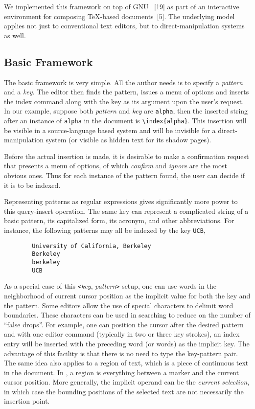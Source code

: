 We implemented this framework on top of
GNU {\E}~[19] as part of an interactive environment for
composing {\TeX}-based documents~[5].
The underlying model applies not just to conventional text
editors, but to direct-manipulation systems as well.

\subsection{Basic Framework}
The basic framework is very simple.  All the author needs is
to specify a {\it pattern\/} and a {\it key\/}.
The editor then finds the pattern,
issues a menu of options and inserts the index command along with the key
as its argument upon the user's request.
In our example, suppose both {\it pattern\/} and {\it key\/} are
\verb|alpha|, then the inserted string after an instance
of \verb|alpha| in the document is \verb|\index{alpha}|.
This insertion will be visible in a source-language based system and will be
invisible for a direct-manipulation system (or visible as hidden text
for its shadow pages).

Before the actual insertion is made, it is desirable to make a confirmation
request that presents a menu of options, of which
{\it confirm\/} and {\it ignore\/} are the most obvious ones.
Thus for each instance of the pattern found, the user can decide if
it is to be indexed.

Representing patterns as regular expressions gives significantly more power
to this query-insert operation.  The same key can represent a complicated
string of a basic pattern, its capitalized form, its acronym, and other
abbreviations.  For instance, the following patterns may all be indexed
by the key \verb|UCB|,
\begin{verbatim}
        University of California, Berkeley
        Berkeley
        berkeley
        UCB
\end{verbatim}

As a special case of this \verb|<|{\it key\/}, {\it pattern\/}\verb|>|
setup, one can use words in the neighborhood of current cursor position
as the implicit value for both the key and the pattern.
Some editors allow the use of special characters to delimit word boundaries.
These characters can be used in searching to reduce on the number of
``false drops''.  For example, one can position the cursor
after the desired pattern and with one editor command (typically
in two or three key strokes), an index entry will
be inserted with the preceding word (or words) as the implicit key.
The advantage of this facility is that there is no need to type
the key-pattern pair.
The same idea also applies to a region of text, which is a piece of
continuous text in the document.  In {\E}, a region is
everything between a marker and the current cursor position.
More generally, the implicit operand can be the {\it current selection\/},
in which case the bounding positions of the selected text
are not necessarily the insertion point.

